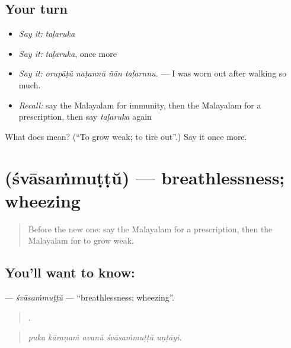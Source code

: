 \subsection*{Your turn}
\begin{itemize}
\raggedright
  \item \emph{Say it:} \emph{taḷaruka}
  \item \emph{Say it:} \emph{taḷaruka}, once more
  \item \emph{Say it:} \emph{orupāṭŭ naṭannŭ ñān taḷarnnu.} — I was worn out after walking so much.
  \item \emph{Recall:} say the Malayalam for immunity, then the Malayalam for a prescription, then say \emph{taḷaruka} again
\end{itemize}

\begin{tcolorbox}[breakable,colback=teal!4,colframe=teal!35!black,title={Before you move on}]
What does  mean? (\textquotedblleft{}To grow weak; to tire out\textquotedblright{}.) Say it once more.
\end{tcolorbox}
\section[\texorpdfstring{\ml{ശ്വാസംമുട്ട്} (śvāsaṁmuṭṭŭ)}{ശ്വാസംമുട്ട് (śvāsaṁmuṭṭŭ)}]{ (śvāsaṁmuṭṭŭ) — breathlessness; wheezing}

\label{lesson:ML-C533-svasammuttu}



\begin{quote}
Before the new one: say the Malayalam for a prescription, then the Malayalam for to grow weak.
\end{quote}

\subsection*{You'll want to know: }
\textbf{} — \emph{śvāsaṁmuṭṭŭ} — \textquotedblleft{}breathlessness; wheezing\textquotedblright{}.

\begin{quote}
    .
\end{quote}

\begin{quote}
\emph{puka kāraṇaṁ avanŭ śvāsaṁmuṭṭŭ uṇṭāyi.}
\end{quote}

